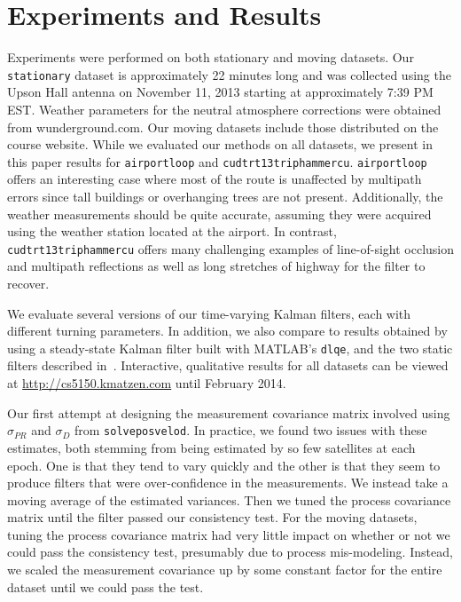 \section{Experiments and Results}\label{sec:experiments}
Experiments were performed on both stationary and moving datasets.  Our \texttt{stationary} dataset is approximately 22 minutes long and was collected using the Upson Hall antenna on November 11, 2013 starting at approximately 7:39 PM EST.  Weather parameters for the neutral atmosphere corrections were obtained from wunderground.com.  Our moving datasets include those distributed on the course website.  While we evaluated our methods on all datasets, we present in this paper results for \texttt{airportloop} and \texttt{cudtrt13triphammercu}. \texttt{airportloop} offers an interesting case where most of the route is unaffected by multipath errors since tall buildings or overhanging trees are not present.  Additionally, the weather measurements should be quite accurate, assuming they were acquired using the weather station located at the airport.  In contrast, \texttt{cudtrt13triphammercu} offers many challenging examples of line-of-sight occlusion and multipath reflections as well as long stretches of highway for the filter to recover.

We evaluate several versions of our time-varying Kalman filters, each with different turning parameters.  In addition, we also compare to results obtained by using a steady-state Kalman filter built with MATLAB's \texttt{dlqe}, and the two static filters described in~\cite{course}.  Interactive, qualitative results for all datasets can be viewed at \url{http://cs5150.kmatzen.com} until February 2014.

Our first attempt at designing the measurement covariance matrix involved using $\sigma_{PR}$ and $\sigma_D$ from \texttt{solveposvelod}.  In practice, we found two issues with these estimates, both stemming from being estimated by so few satellites at each epoch.  One is that they tend to vary quickly and the other is that they seem to produce filters that were over-confidence in the measurements.  We instead take a moving average of the estimated variances.  Then we tuned the process covariance matrix until the filter passed our consistency test.  For the moving datasets, tuning the process covariance matrix had very little impact on whether or not we could pass the consistency test, presumably due to process mis-modeling.  Instead, we scaled the measurement covariance up by some constant factor for the entire dataset until we could pass the test.


